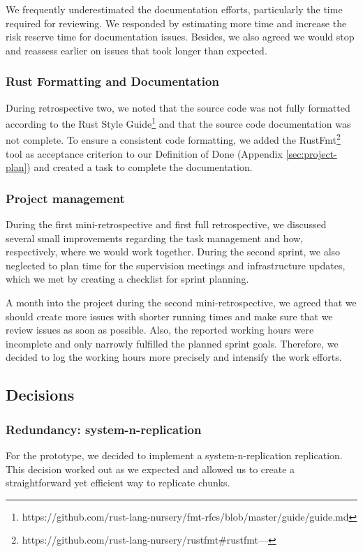 We frequently underestimated the documentation efforts, particularly the time required for reviewing. We responded by estimating more time and increase the risk reserve time for documentation issues. Besides, we also agreed we would stop and reassess earlier on issues that took longer than expected.

\subsubsection{Rust Formatting and Documentation}
During retrospective two, we noted that the source code was not fully formatted according to the Rust Style Guide\footnote{https://github.com/rust-lang-nursery/fmt-rfcs/blob/master/guide/guide.md} and that the source code documentation was not complete. To ensure a consistent code formatting, we added the RustFmt\footnote{https://github.com/rust-lang-nursery/rustfmt\#rustfmt---} tool as acceptance criterion to our Definition of Done (Appendix \ref{sec:project-plan}) and created a task to complete the documentation.

\subsubsection{Project management}
During the first mini-retrospective and first full retrospective, we discussed several small improvements regarding the task management and how, respectively, where we would work together. During the second sprint, we also neglected to plan time for the supervision meetings and infrastructure updates, which we met by creating a checklist for sprint planning.

A month into the project during the second mini-retrospective, we agreed that we should create more issues with shorter running times and make sure that we review issues as soon as possible. Also, the reported working hours were incomplete and only narrowly fulfilled the planned sprint goals. Therefore, we decided to log the working hours more precisely and intensify the work efforts.


\subsection{Decisions}
\subsubsection{Redundancy: \gls{system-n-replication}}
For the prototype, we decided to implement a \gls{system-n-replication} replication. This decision worked out as we expected and allowed us to create a straightforward yet efficient way to replicate \glspl{chunk}.

